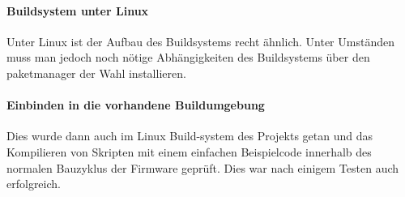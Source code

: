 \paragraph*{Buildsystem unter Linux}
Unter Linux ist der Aufbau des Buildsystems recht ähnlich. Unter Umständen muss man jedoch noch nötige Abhängigkeiten des Buildsystems über den paketmanager der Wahl installieren. \\

\paragraph*{Einbinden in die vorhandene Buildumgebung}
Dies wurde dann auch im Linux Build-system des Projekts getan und das Kompilieren von Skripten mit einem einfachen Beispielcode innerhalb des normalen Bauzyklus der Firmware geprüft. Dies war nach einigem Testen auch erfolgreich.
